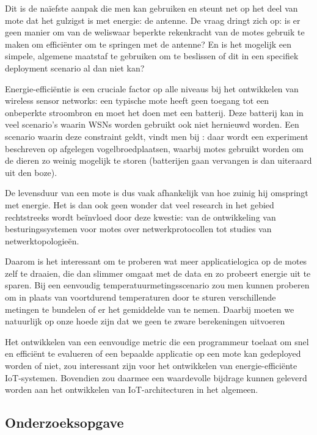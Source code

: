 \documentclass[11pt]{article}
\begin{document}
Dit is de na\"iefste aanpak die men kan gebruiken en steunt net op het deel van
mote dat het gulzigst is met energie: de antenne.  De vraag dringt zich op: is
er geen manier om van de weliswaar beperkte rekenkracht van de motes gebruik te
maken om effici\"enter om te springen met de antenne? En is het mogelijk een
simpele, algemene maatstaf te gebruiken om te beslissen of dit in een specifiek
deployment scenario al dan niet kan?

Energie-effici\"entie is een cruciale factor op alle niveaus bij het ontwikkelen
van wireless sensor networks: een typische mote heeft geen toegang tot een
onbeperkte stroombron en moet het doen met een batterij. Deze batterij kan in
veel scenario's waarin WSNs worden gebruikt ook niet hernieuwd worden. Een
scenario waarin deze constraint geldt, vindt men bij
\cite{mainwaring2002wireless}: daar wordt een experiment beschreven op afgelegen
vogelbroedplaatsen, waarbij motes gebruikt worden om de dieren zo weinig
mogelijk te storen (batterijen gaan vervangen is dan uiteraard uit den boze).

De levensduur van een mote is dus vaak afhankelijk van hoe zuinig hij
omspringt met energie. Het is dan ook geen wonder dat veel research in het
gebied rechtstreeks wordt be\"invloed door deze kwestie: van de ontwikkeling van
besturingssystemen voor motes over netwerkprotocollen tot studies van
netwerktopologie\"en.

Daarom is het interessant om te proberen wat meer applicatielogica op de motes
zelf te draaien, die dan slimmer omgaat met de data en zo probeert energie uit
te sparen. Bij een eenvoudig temperatuurmetingsscenario zou men kunnen proberen
om in plaats van voortdurend temperaturen door te sturen verschillende metingen
te bundelen of er het gemiddelde van te nemen. Daarbij moeten we natuurlijk op
onze hoede zijn dat we geen te zware berekeningen uitvoeren

Het ontwikkelen van een eenvoudige metric die een programmeur toelaat om snel en
effici\"ent te evalueren of een bepaalde applicatie op een mote kan gedeployed
worden of niet, zou interessant zijn voor het ontwikkelen van
energie-effici\"ente IoT-systemen. Bovendien zou daarmee een waardevolle
bijdrage kunnen geleverd worden aan het ontwikkelen van IoT-architecturen in
het algemeen.

\subsection{Onderzoeksopgave}
\end{document}
